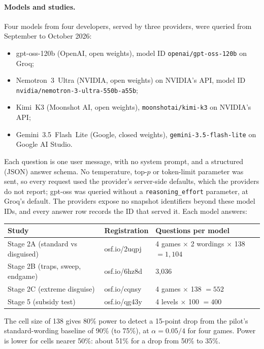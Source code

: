 \documentclass[11pt]{article}
\theoremstyle{definition}
\theoremstyle{remark}
\begin{document}
\paragraph{Models and studies.} Four models from four developers, served by three providers,
were queried from September to October 2026:
\begin{itemize}
\item gpt-oss-120b (OpenAI, open weights), model ID \nolinkurl{openai/gpt-oss-120b} on Groq;
\item Nemotron~3~Ultra (NVIDIA, open weights) on NVIDIA's API, model ID\\
  \nolinkurl{nvidia/nemotron-3-ultra-550b-a55b};
\item Kimi~K3 (Moonshot AI, open weights), \nolinkurl{moonshotai/kimi-k3} on NVIDIA's API;
\item Gemini~3.5~Flash~Lite (Google, closed weights), \nolinkurl{gemini-3.5-flash-lite} on Google
  AI Studio.
\end{itemize}
Each question is one user message, with no system prompt, and a structured (JSON) answer
schema. No temperature, top-$p$ or token-limit parameter was sent, so every request used the
provider's server-side defaults, which the providers do not report; gpt-oss was queried without a
\texttt{reasoning\_effort} parameter, at Groq's default. The providers expose no snapshot
identifiers beyond these model IDs, and every answer row records the ID that served it. Each
model answers:

\begin{center}
\small
\begin{tabular}{@{}lll@{}}
\toprule
Study & Registration & Questions per model \\
\midrule
Stage 2A (standard vs disguised) & osf.io/2uqpj & 4 games $\times$ 2 wordings $\times$ 138 $=1{,}104$ \\
Stage 2B (traps, sweep, endgame) & osf.io/6hz8d & 3{,}036 \\
Stage 2C (extreme disguise) & osf.io/cqnsy & 4 games $\times$ 138 $=552$ \\
Stage 5 (subsidy test) & osf.io/qg43y & 4 levels $\times$ 100 $=400$ \\
\bottomrule
\end{tabular}
\end{center}

\noindent The cell size of 138 gives 80\% power to detect a 15-point drop from the pilot's
standard-wording baseline of 90\% (to 75\%), at $\alpha=0.05/4$ for four games. Power is lower
for cells nearer 50\%: about 51\% for a drop from 50\% to 35\%.
\end{document}
